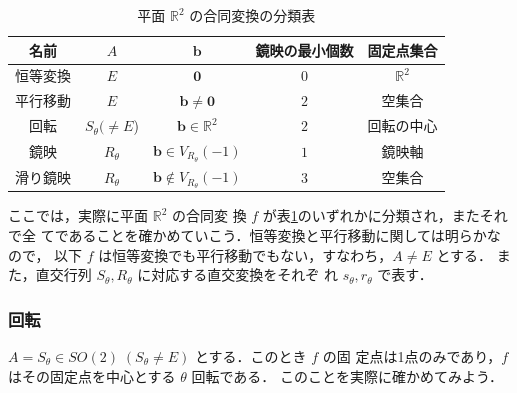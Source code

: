 \documentclass[11pt, uplatex, dvipdfmx, titlepage]{jsarticle}
\theoremstyle{definition}
\begin{document}
\begin{table}[h]
  \centering
  \begin{tabular}[h]{|c|c|c|c|c|}\hline
    名前 & $A$ & $\bm{b}$ & 鏡映の最小個数 & 固定点集合\\ \hline
    恒等変換 & $E$ & $\bm{0}$ & $0$ & $\mathbb{R}^2$ \\
    平行移動 & $E$ & $\bm{b} \neq \bm{0}$ & $2$ & 空集合\\
    回転 & $S_{\theta} (\neq E$) & $\bm{b} \in \mathbb{R}^2$ & $2$ & 回転の中心\\
    鏡映 & $R_{\theta}$ & $\bm{b} \in V_{R_{\theta}}(-1)$ & $1$ & 鏡映軸  \\
    滑り鏡映 & $R_{\theta}$ & $\bm{b} \notin V_{R_{\theta}}(-1)$ & $3$ & 空集合\\ \hline
  \end{tabular}
  \caption{平面 $\mathbb{R}^2$ の合同変換の分類表}
  \label{tab:classification2}
\end{table}


ここでは，実際に平面 $\mathbb{R}^2$ の合同変
換 $f$ が表\ref{tab:classification2}のいずれかに分類され，またそれで全
てであることを確かめていこう．恒等変換と平行移動に関しては明らかなので，
以下 $f$ は恒等変換でも平行移動でもない，すなわち，$A \neq E$ とする．
また，直交行列 $S_{\theta}, R_{\theta}$ に対応する直交変換をそれぞ
れ $s_{\theta}, r_{\theta}$ で表す．

\subsubsection{回転}\label{sec:rotation2}

$A = S_{\theta} \in SO(2) \; (S_{\theta} \neq E)$ とする．このとき $f$ の固
定点は1点のみであり，$f$ はその固定点を中心とする $\theta$ 回転である．
このことを実際に確かめてみよう．
\end{document}
